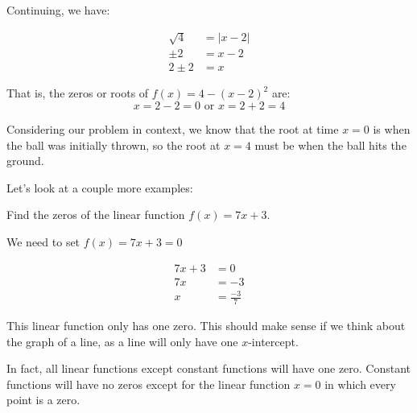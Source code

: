\documentclass[nooutcomes]{ximera}
\begin{document}
\begin{example}
\begin{explanation}
Continuing, we have:

\begin{align*}
\sqrt{4}&= |x-2|\\
\pm 2&= x-2\\
2\pm 2&= x
\end{align*}  

That is, the zeros or roots of $f(x)=4-(x-2)^2$  are:
$$
x=2-2=0 \text{ or } x=2+2=4
$$

Considering our problem in context, we know that the root at time $x=0$ is when the ball was initially thrown, so the root at $x=4$ must be when the ball hits the ground.

\end{explanation}

\end{example}

Let's look at a couple more examples:

\begin{example}
Find the zeros of the linear function $f(x)=7x+3$.

\begin{explanation}
We need to set $f(x)=7x+3=0$

\begin{align*}
7x+3&=0\\
7x&=-3\\
x&=\tfrac{-3}{7}
\end{align*}  

This linear function only has one zero.  This should make sense if we think about the graph of a line, as a line will only have one $x$-intercept.

\begin{image}
\end{image}

In fact, all linear functions except constant functions will have one zero.  Constant functions will have no zeros except for the linear function $x=0$ in which every point is a zero.
\end{explanation}
\end{example}
\end{document}
